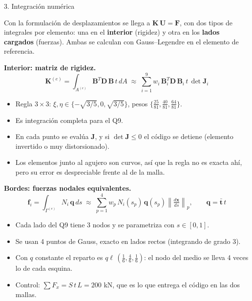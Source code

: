 \begin{desarrollo}{3. Integraci\'on num\'erica}

Con la formulaci\'on de desplazamientos se llega a $\mathbf{K}\,\mathbf{U}=\mathbf{F}$,
con dos tipos de integrales por elemento: una en el \textbf{interior} (rigidez) y
otra en los \textbf{lados cargados} (fuerzas). Ambas se calculan con Gauss--Legendre
en el elemento de referencia.

\textbf{Interior: matriz de rigidez.}
\[
\mathbf{K}^{(e)}=\int_{A^{(e)}}\mathbf{B}^T\mathbf{D}\,\mathbf{B}\,t\,dA
\;\approx\;\sum_{i=1}^{9} w_i\,\mathbf{B}_i^T\mathbf{D}\,\mathbf{B}_i\,t\,\det\mathbf{J}_i
\]
\begin{itemize}[itemsep=2pt]
  \item Regla $3\times3$: $\xi,\eta\in\{-\sqrt{3/5},0,\sqrt{3/5}\}$, pesos
  $\{\tfrac{25}{81},\tfrac{40}{81},\tfrac{64}{81}\}$.
  \item Es integraci\'on completa para el Q9. 
  \item En cada punto se eval\'ua $\mathbf{J}$, y si $\det\mathbf{J}\le0$ el
  c\'odigo se detiene (elemento invertido o muy distorsionado).
  \item Los elementos junto al agujero son curvos, as\'i que la regla no es
  exacta ah\'i, pero su error es despreciable frente al de la malla.
\end{itemize}

\textbf{Bordes: fuerzas nodales equivalentes.}
\[
\mathbf{f}_i=\int_{\Gamma^{(e)}}N_i\,\mathbf{q}\,ds
\;\approx\;\sum_{p=1}^{4} w_p\,N_i(s_p)\,\mathbf{q}(s_p)\left\lVert\tfrac{d\mathbf{x}}{ds}\right\rVert_p,
\qquad \mathbf{q}=\bar{\mathbf{t}}\,t
\]
\begin{itemize}[itemsep=2pt]
  \item Cada lado del Q9 tiene 3 nodos y se parametriza con $s\in[0,1]$.
  \item Se usan 4 puntos de Gauss, exacto en lados rectos (integrando de grado 3).
  \item Con $q$ constante el reparto es $q\ell\,(\tfrac16,\tfrac46,\tfrac16)$:
  el nodo del medio se lleva 4 veces lo de cada esquina.
  \item Control: $\sum F_x = S\,t\,L = 200$ kN, que es lo que entrega el c\'odigo
  en las dos mallas.
\end{itemize}

\begin{center}
\end{center}
\end{desarrollo}


